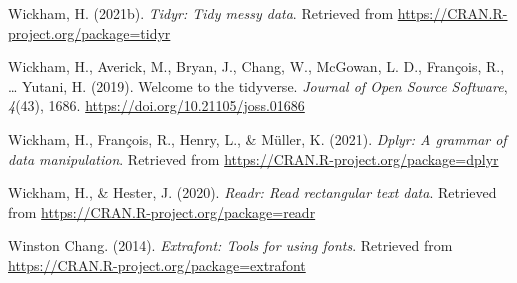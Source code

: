 \documentclass[
  english,
  man,floatsintext]{apa6}
\begin{document}
\leavevmode\hypertarget{ref-R-tidyr}{}%
Wickham, H. (2021b). \emph{Tidyr: Tidy messy data}. Retrieved from \url{https://CRAN.R-project.org/package=tidyr}

\leavevmode\hypertarget{ref-R-tidyverse}{}%
Wickham, H., Averick, M., Bryan, J., Chang, W., McGowan, L. D., François, R., \ldots{} Yutani, H. (2019). Welcome to the tidyverse. \emph{Journal of Open Source Software}, \emph{4}(43), 1686. \url{https://doi.org/10.21105/joss.01686}

\leavevmode\hypertarget{ref-R-dplyr}{}%
Wickham, H., François, R., Henry, L., \& Müller, K. (2021). \emph{Dplyr: A grammar of data manipulation}. Retrieved from \url{https://CRAN.R-project.org/package=dplyr}

\leavevmode\hypertarget{ref-R-readr}{}%
Wickham, H., \& Hester, J. (2020). \emph{Readr: Read rectangular text data}. Retrieved from \url{https://CRAN.R-project.org/package=readr}

\leavevmode\hypertarget{ref-R-extrafont}{}%
Winston Chang. (2014). \emph{Extrafont: Tools for using fonts}. Retrieved from \url{https://CRAN.R-project.org/package=extrafont}

\endgroup
\end{document}

